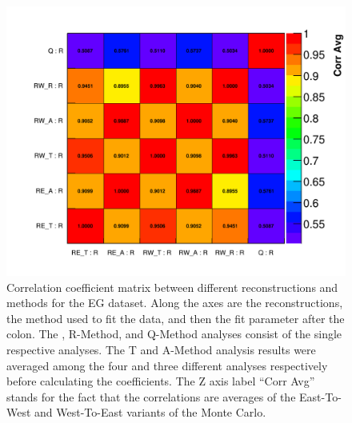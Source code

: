 \begin{figure}
\centering
\includegraphics[width=\textwidth]{Avg_Recon_CorrelationMatrix_R_R}
\caption{Correlation coefficient matrix between different reconstructions and methods for the EG dataset. Along the axes are the reconstructions, the method used to fit the data, and then the fit parameter after the colon. The \RE, R-Method, and Q-Method analyses consist of the single respective analyses. The \RW T and A-Method analysis results were averaged among the four and three different analyses respectively before calculating the coefficients. The Z axis label ``Corr Avg'' stands for the fact that the correlations are averages of the East-To-West and West-To-East variants of the Monte Carlo.}
\label{fig:corrMatRecon}
\end{figure}





